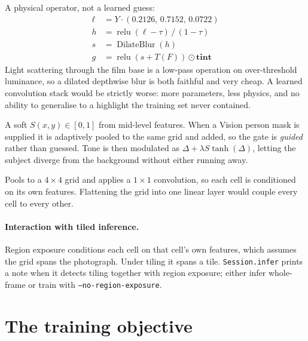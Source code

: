 \documentclass[11pt,a4paper]{article}
\newcommand{\code}[1]{\texttt{#1}}
\newcommand{\flag}[1]{\texttt{--#1}}
\begin{document}
\begin{description}[leftmargin=1.4em,style=nextline]
  \item[Halation] A physical operator, not a learned guess:
    \begin{equation}
      \begin{aligned}
        \ell      &= Y \cdot (0.2126,\, 0.7152,\, 0.0722) \\
        h        &= \operatorname{relu}(\ell - \tau)\,/\,(1-\tau) \\
        s        &= \operatorname{DilateBlur}(h) \\
        g        &= \operatorname{relu}(s + T(F)) \odot \mathbf{tint}
      \end{aligned}
    \end{equation}
    Light scattering through the film base is a low-pass operation on
    over-threshold luminance, so a dilated depthwise blur is both faithful and
    very cheap. A learned convolution stack would be strictly worse: more
    parameters, less physics, and no ability to generalise to a highlight the
    training set never contained.
  \item[Subject gate] A soft $S(x,y) \in [0,1]$ from mid-level features. When a
    Vision person mask is supplied it is adaptively pooled to the same grid and
    added, so the gate is \emph{guided} rather than guessed. Tone is then
    modulated as $\Delta + \lambda S \tanh(\Delta)$, letting the subject diverge
    from the background without either running away.
  \item[Region exposure] Pools to a $4\times4$ grid and applies a $1\times1$
    convolution, so each cell is conditioned on its own features. Flattening the
    grid into one linear layer would couple every cell to every other.
\end{description}

\paragraph{Interaction with tiled inference.}
Region exposure conditions each cell on that cell's own features, which assumes
the grid spans the photograph. Under tiling it spans a tile. \code{Session.infer}
prints a note when it detects tiling together with region exposure; either infer
whole-frame or train with \flag{no-region-exposure}.

\section{The training objective}
\end{document}
